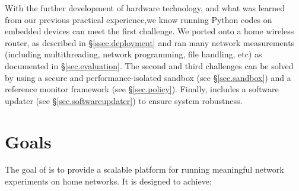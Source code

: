 With the further development of hardware technology, and what was learned from our
 previous practical experience,we know running Python codes on embedded devices can
 meet the first challenge. We ported \sysname onto a home wireless router, as described
 in \S{\ref{ssec.deployment}} and ran many network measurements (including
 multithreading, network programming, file handling, etc) as documented
 in \S{\ref{sec.evaluation}}. The second and third challenges can be solved by
  using a secure and performance-isolated sandbox (see \S{\ref{sec.sandbox}})
   and a reference monitor framework (see \S{\ref{sec.policy}}). Finally, \sysname
includes a software updater (see \S{\ref{sec.softwareupdater}}) to ensure system robustness.

\section{Goals}
\label{ssec.goals}
The goal of \sysname is to provide a scalable platform for running meaningful network experiments
 on home networks. It is designed to achieve:
